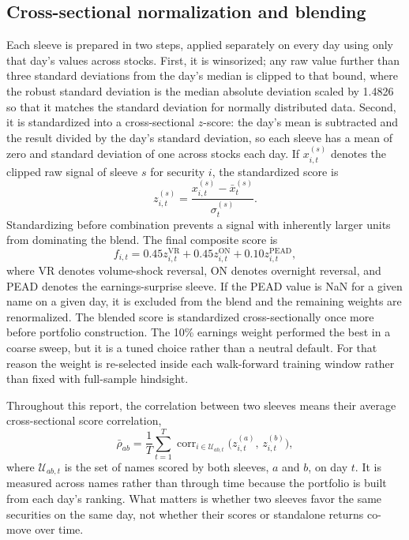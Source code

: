 \documentclass[11pt]{article}
\begin{document}
\subsection{Cross-sectional normalization and blending}

Each sleeve is prepared in two steps, applied separately on every day using only that day's values across stocks. First, it is winsorized; any raw value further than three standard deviations from the day's median is clipped to that bound, where the robust standard deviation is the median absolute deviation scaled by 1.4826 so that it matches the standard deviation for normally distributed data. Second, it is standardized into a cross-sectional $z$-score: the day's mean is subtracted and the result divided by the day's standard deviation, so each sleeve has a mean of zero and standard deviation of one across stocks each day. If $x_{i,t}^{(s)}$ denotes the clipped raw signal of sleeve $s$ for security $i$, the standardized score is
\begin{equation}
 z_{i,t}^{(s)} = \frac{x_{i,t}^{(s)}-\bar{x}_{t}^{(s)}}{\sigma_t^{(s)}}.
\end{equation}
Standardizing before combination prevents a signal with inherently larger units from dominating the blend. The final composite score is
\begin{equation}
 f_{i,t}=0.45z_{i,t}^{\mathrm{VR}}+0.45z_{i,t}^{\mathrm{ON}}+0.10z_{i,t}^{\mathrm{PEAD}},
\end{equation}
where VR denotes volume-shock reversal, ON denotes overnight reversal, and PEAD denotes the earnings-surprise sleeve. If the PEAD value is NaN for a given name on a given day, it is excluded from the blend and the remaining weights are renormalized. The blended score is standardized cross-sectionally once more before portfolio construction. The 10\% earnings weight performed the best in a coarse sweep, but it is a tuned choice rather than a neutral default. For that reason the weight is re-selected inside each walk-forward training window rather than fixed with full-sample hindsight.

Throughout this report, the correlation between two sleeves means their average cross-sectional score correlation,
\begin{equation}
 \bar{\rho}_{ab}=\frac{1}{T}\sum_{t=1}^{T}\operatorname{corr}_{i\in\mathcal{U}_{ab,t}}\!\bigl(z_{i,t}^{(a)},\,z_{i,t}^{(b)}\bigr),
\label{eq:sleevecorr}
\end{equation}
where $\mathcal{U}_{ab,t}$ is the set of names scored by both sleeves, $a$ and $b$, on day $t$. It is measured across names rather than through time because the portfolio is built from each day's ranking. What matters is whether two sleeves favor the same securities on the same day, not whether their scores or standalone returns co-move over time.
\end{document}
